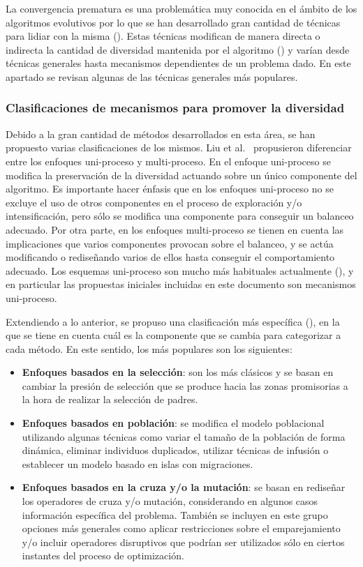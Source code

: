 La convergencia prematura es una problemática muy conocida en el ámbito de los algoritmos evolutivos por lo que se han 
desarrollado gran cantidad de técnicas para lidiar con la misma (\cite{pandey2014comparative}).
%
Estas técnicas modifican de manera directa o indirecta la cantidad de diversidad mantenida por el algoritmo (\cite{Joel:Crepinsek})
y varían desde técnicas generales hasta mecanismos dependientes de un problema dado.
%
En este apartado se revisan algunas de las técnicas generales más populares.

\subsubsection{Clasificaciones de mecanismos para promover la diversidad}

Debido a la gran cantidad de métodos desarrollados en esta área, se han propuesto varias clasificaciones de los mismos.
%
Liu et al.~\cite{liu2009explore} propusieron diferenciar entre los enfoques uni-proceso y multi-proceso.
%
En el enfoque uni-proceso se modifica la preservación de la diversidad actuando sobre un único componente del algoritmo. 
%
Es importante hacer énfasis que en los enfoques uni-proceso no se excluye el uso de otros componentes en el proceso de 
exploración y/o intensificación, pero sólo se modifica una componente para conseguir un balanceo adecuado.
%
Por otra parte, en los enfoques multi-proceso se tienen en cuenta las implicaciones que varios componentes 
provocan sobre el balanceo, y se actúa modificando o rediseñando varios de ellos hasta conseguir el comportamiento adecuado.
%
Los esquemas uni-proceso son mucho más habituales actualmente (\cite{Crepinsek:13}), y en particular las propuestas 
iniciales incluidas en este documento son mecanismos uni-proceso.

Extendiendo a lo anterior, se propuso una clasificación más específica (\cite{Crepinsek:13}), en la que se tiene en cuenta 
cuál es la componente que se cambia para categorizar a cada método.
%
En este sentido, los más populares son los siguientes:

\begin{itemize}
\item \textbf{Enfoques basados en la selección}: son los más clásicos y se basan en cambiar la presión de selección que se 
produce hacia las zonas promisorias a la hora de realizar la selección de padres.
\item \textbf{Enfoques basados en población}: se modifica el modelo poblacional utilizando algunas técnicas como variar el 
tamaño de la población de forma dinámica, eliminar individuos duplicados, utilizar técnicas de infusión o establecer un
modelo basado en islas con migraciones.
\item \textbf{Enfoques basados en la cruza y/o la mutación}: se basan en rediseñar los operadores de cruza y/o mutación, 
considerando en algunos casos información específica del problema. También se incluyen en este grupo opciones más generales 
como aplicar restricciones sobre el emparejamiento y/o incluir operadores disruptivos que podrían ser utilizados sólo en 
ciertos instantes del proceso de optimización.
\end{itemize}


